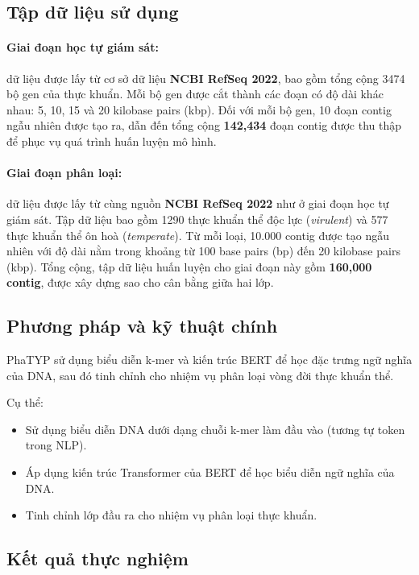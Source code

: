 \subsection*{Tập dữ liệu sử dụng}
\paragraph{Giai đoạn học tự giám sát:} dữ liệu được lấy từ cơ sở dữ liệu \textbf{NCBI RefSeq 2022}, bao gồm tổng cộng 3474 bộ gen của thực khuẩn. Mỗi bộ gen được cắt thành các đoạn có độ dài khác nhau: 5, 10, 15 và 20 kilobase pairs (kbp). Đối với mỗi bộ gen, 10 đoạn contig ngẫu nhiên được tạo ra, dẫn đến tổng cộng \textbf{142,434} đoạn contig được thu thập để phục vụ quá trình huấn luyện mô hình.

\paragraph{Giai đoạn phân loại:} dữ liệu được lấy từ cùng nguồn \textbf{NCBI RefSeq 2022} như ở giai đoạn học tự giám sát. Tập dữ liệu bao gồm 1290 thực khuẩn thể độc lực (\textit{virulent}) và 577 thực khuẩn thể ôn hoà (\textit{temperate}). Từ mỗi loại, 10.000 contig được tạo ngẫu nhiên với độ dài nằm trong khoảng từ 100 base pairs (bp) đến 20 kilobase pairs (kbp). Tổng cộng, tập dữ liệu huấn luyện cho giai đoạn này gồm \textbf{160,000 contig}, được xây dựng sao cho cân bằng giữa hai lớp.

\subsection*{Phương pháp và kỹ thuật chính}
PhaTYP sử dụng biểu diễn k-mer và kiến trúc BERT để học đặc trưng ngữ nghĩa của DNA, sau đó tinh chỉnh cho nhiệm vụ phân loại vòng đời thực khuẩn thể. 

Cụ thể:
\begin{itemize}
    \item Sử dụng biểu diễn DNA dưới dạng chuỗi k-mer làm đầu vào (tương tự token trong NLP).
    \item Áp dụng kiến trúc Transformer của BERT để học biểu diễn ngữ nghĩa của DNA.
    \item Tinh chỉnh lớp đầu ra cho nhiệm vụ phân loại thực khuẩn.
\end{itemize}

\subsection*{Kết quả thực nghiệm}

